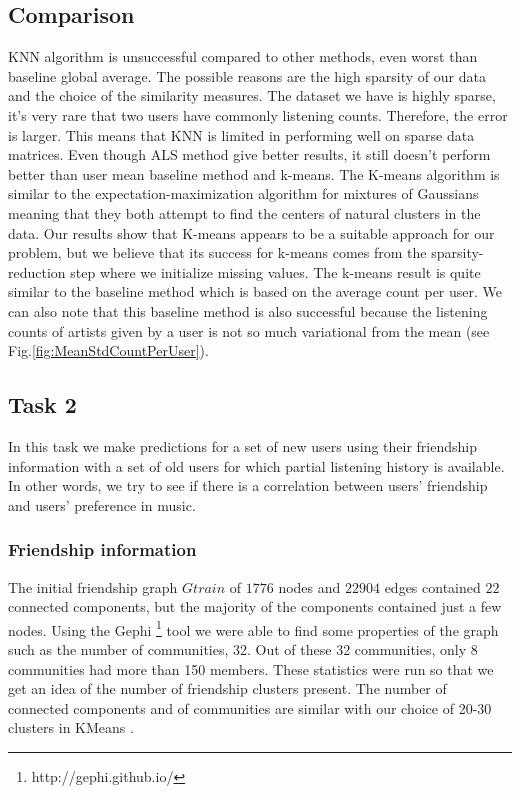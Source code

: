\subsection{Comparison}

KNN algorithm is unsuccessful compared to other methods, even worst than baseline global average. The possible reasons are the high sparsity of our data and the choice of the similarity measures. The dataset we have is highly sparse, it’s very rare that two users have commonly listening counts. Therefore, the error is larger. This means that KNN is limited in  performing well on sparse data matrices. Even though ALS method give better results, it still doesn't perform better than user mean baseline method and k-means. The K-means algorithm is similar to the expectation-maximization algorithm for mixtures of Gaussians meaning that they both attempt to find the centers of natural clusters in the data. Our results show that K-means appears to be a suitable approach for our problem, but we believe that its success for k-means comes from the sparsity-reduction step where we initialize missing values. The k-means result is quite similar to the baseline method which is based on the average count per user. We can also note that this baseline method is also successful because the listening counts of artists given by a user is not so much variational from the mean (see Fig.\ref{fig:MeanStdCountPerUser}).

\subsection{Task 2}
In this task we make predictions for a set of new users using their friendship information with a set of old users for which partial listening history is available. In other words, we try to see if there is a correlation between
users' friendship and users' preference in music.

\subsubsection{Friendship information}
The initial friendship graph $Gtrain$ of $1776$ nodes and $22904$ edges contained $22$ connected components, but the majority of the components contained just a few nodes.
Using the Gephi  \footnote{http://gephi.github.io/} tool we were able to find some properties of the graph such as the number of communities, 32.  Out of these 32 communities, only 8 communities had more than 150 members.
These statistics were run so that we get an idea of the number of friendship clusters present. The number of connected components and of communities are similar with our choice of 20-30 clusters in KMeans .

